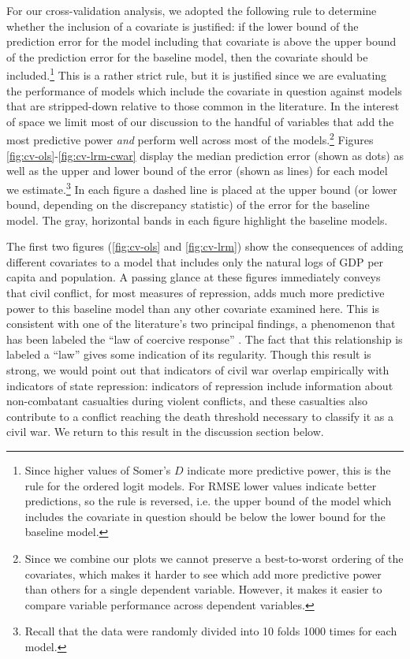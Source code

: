 \documentclass[11pt]{article}
\begin{document}
For our cross-validation analysis, we adopted the following rule to determine whether the inclusion of a covariate is justified: if the lower bound of the prediction error for the model including that covariate is above the upper bound of the prediction error for the baseline model, then the covariate should be included.\footnote{Since higher values of Somer's $D$ indicate more predictive power, this is the rule for the ordered logit models. For RMSE lower values indicate better predictions, so the rule is reversed, i.e. the upper bound of the model which includes the covariate in question should be below the lower bound for the baseline model.} This is a rather strict rule, but it is justified since we are evaluating the performance of models which include the covariate in question against models that are stripped-down relative to those common in the literature. In the interest of space we limit most of our discussion to the handful of variables that add the most predictive power {\em and} perform well across most of the models.\footnote{Since we combine our plots we cannot preserve a best-to-worst ordering of the covariates, which makes it harder to see which add more predictive power than others for a single dependent variable. However, it makes it easier to compare variable performance across dependent variables.} Figures \ref{fig:cv-ols}-\ref{fig:cv-lrm-cwar} display the median prediction error (shown as dots) as well as the upper and lower bound of the error (shown as lines) for each model we estimate.\footnote{Recall that the data were randomly divided into 10 folds 1000 times for each model.} In each figure a dashed line is placed at the upper bound (or lower bound, depending on the discrepancy statistic) of the error for the baseline model. The gray, horizontal bands in each figure highlight the baseline models. 

The first two figures (\ref{fig:cv-ols} and \ref{fig:cv-lrm}) show the consequences of adding different covariates to a model that includes only the natural logs of GDP per capita and population. A passing glance at these figures immediately conveys that civil conflict, for most measures of repression, adds much more predictive power to this baseline model than any other covariate examined here. This is consistent with one of the literature's two principal findings, a phenomenon that has been labeled the ``law of coercive response'' \citep{Davenport2007AR}. The fact that this relationship is labeled a ``law'' gives some indication of its regularity. Though this result is strong, we would point out that indicators of civil war overlap empirically with indicators of state repression: indicators of repression include information about non-combatant casualties during violent conflicts, and these casualties also contribute to a conflict reaching the death threshold necessary to classify it as a civil war. We return to this result in the discussion section below. 
\end{document}
